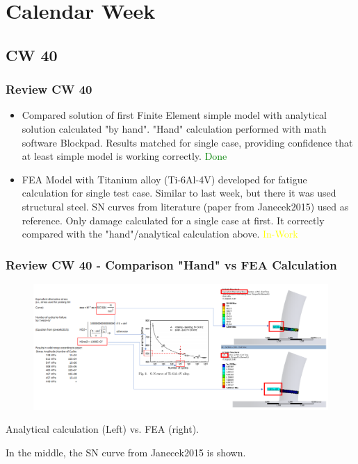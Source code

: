\section{Calendar Week}
\subsection{CW 40}
\begin{frame}
  \frametitle{Review CW 40}
	\begin{itemize}
		\item Compared solution of first Finite Element simple model with analytical solution calculated "by hand". "Hand" calculation performed with math software Blockpad. Results matched for single case, providing confidence that at least simple model is working correctly. \textcolor{green}{Done}
		\item FEA Model with Titanium alloy (Ti-6Al-4V) developed for fatigue calculation for single test case. Similar to last week, but there it was used structural steel. SN curves from literature (paper from Janecek2015) used as reference. Only damage calculated for a single case at first. It correctly compared with the "hand"/analytical calculation above. \textcolor{yellow}{In-Work}
	\end{itemize}
\end{frame}

\begin{frame}
  \frametitle{Review CW 40 - Comparison "Hand" vs FEA Calculation}
	\begin{figure}
		\includegraphics[width=1.0\textwidth]{pictures/CW40}
	\end{figure}
	\centering Analytical calculation (Left) vs. FEA (right).
	
	\centering In the middle, the SN curve from Janecek2015 is shown.
\end{frame}


